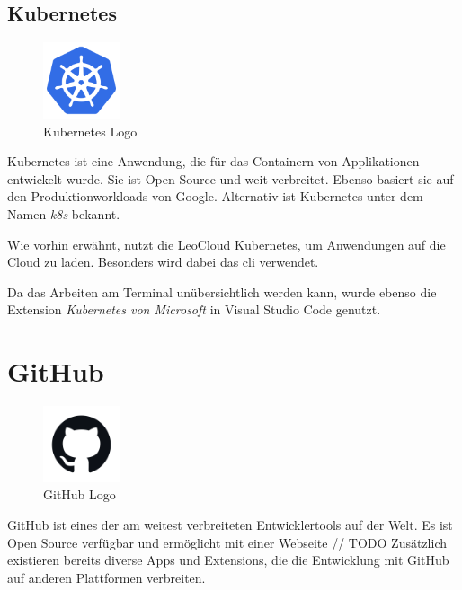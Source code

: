 \subsection{Kubernetes}
\begin{figure}
  \begin{center}
    \includegraphics[width=0.2\textwidth]{pics/logos/k8s.png}
   \caption{Kubernetes Logo}
  \end{center}
\end{figure}
Kubernetes ist eine Anwendung, die für das Containern von Applikationen entwickelt wurde. 
Sie ist Open Source und weit verbreitet. 
Ebenso basiert sie auf den Produktionworkloads von Google.
Alternativ ist Kubernetes unter dem Namen \emph{k8s} bekannt.
\cite{k8sAbout}

Wie vorhin erwähnt, nutzt die LeoCloud Kubernetes, um Anwendungen auf die Cloud zu laden. 
Besonders wird dabei das \gls{cli} verwendet. 

Da das Arbeiten am Terminal unübersichtlich werden kann, wurde ebenso die Extension \emph{Kubernetes von Microsoft} in Visual Studio Code genutzt.
\cite{k8sAboutExtension}

\section{GitHub}
\begin{figure}
  \begin{center}
      \includegraphics[width=0.2\textwidth]{pics/logos/github.png}
      \caption{GitHub Logo}
  \end{center}
\end{figure}
GitHub ist eines der am weitest verbreiteten Entwicklertools auf der Welt. 
Es ist Open Source verfügbar und ermöglicht mit einer Webseite // TODO 
Zusätzlich existieren bereits diverse Apps und Extensions, die die Entwicklung mit GitHub auf anderen Plattformen verbreiten.
\cite{githubAbout}

